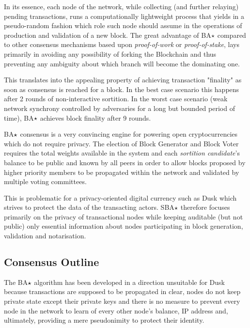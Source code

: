 In its essence, each node of the network, while collecting (and further relaying) pending transactions, runs a computationally lightweight process that yields in a pseudo-random fashion which role such node should assume in the operations of production and validation of a new block. The great advantage of BA$\large\star$ compared to other consensus mechanisms based upon \textit{proof-of-work} or \textit{proof-of-stake}, lays primarily in avoiding any possibility of forking the Blockchain and thus preventing any ambiguity about which branch will become the dominating one.

This translates into the appealing property of achieving transaction "finality" as soon as consensus is reached for a block. In the best case scenario this happens after 2 rounds of non-interactive sortition. In the worst case scenario (weak network synchrony controlled by adversaries for a long but  bounded period of time), BA$\large\star$ achieves block finality after 9 rounds.

BA$\large\star$ consensus is a very convincing engine for powering open cryptocurrencies which do not require privacy. The election of Block Generator and Block Voter requires the total weights available in the system and each \textit{sortition candidate}'s balance to be public and known by all peers in order to allow blocks proposed by higher priority members to be propagated within the network and validated by multiple voting committees.

This is problematic for a privacy-oriented digital currency such as \textrm{Dusk} which strives to protect the data of the transacting actors. SBA$\large\star$ therefore focuses primarily on the privacy of transactional nodes while keeping auditable (but not public) only essential information about nodes participating in block generation, validation and notarisation.

\subsection{Consensus Outline}

The BA$\large\star$ algorithm has been developed in a direction unsuitable for \textrm{Dusk} because transactions are supposed to be propagated in clear, nodes do not keep private state except their private keys and there is no measure to prevent every node in the network to learn of every other node's balance, IP address and, ultimately, providing a mere pseudonimity to protect their identity.

